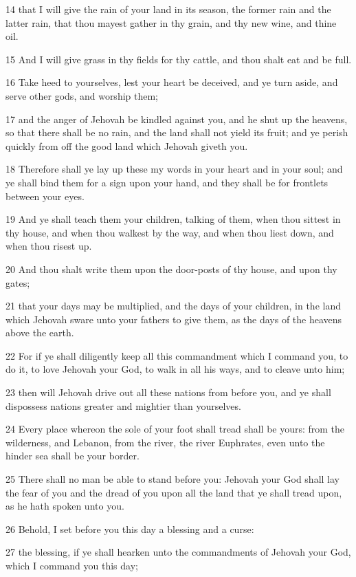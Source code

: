 \par 14 that I will give the rain of your land in its season, the former rain and the latter rain, that thou mayest gather in thy grain, and thy new wine, and thine oil.
\par 15 And I will give grass in thy fields for thy cattle, and thou shalt eat and be full.
\par 16 Take heed to yourselves, lest your heart be deceived, and ye turn aside, and serve other gods, and worship them;
\par 17 and the anger of Jehovah be kindled against you, and he shut up the heavens, so that there shall be no rain, and the land shall not yield its fruit; and ye perish quickly from off the good land which Jehovah giveth you.
\par 18 Therefore shall ye lay up these my words in your heart and in your soul; and ye shall bind them for a sign upon your hand, and they shall be for frontlets between your eyes.
\par 19 And ye shall teach them your children, talking of them, when thou sittest in thy house, and when thou walkest by the way, and when thou liest down, and when thou risest up.
\par 20 And thou shalt write them upon the door-posts of thy house, and upon thy gates;
\par 21 that your days may be multiplied, and the days of your children, in the land which Jehovah sware unto your fathers to give them, as the days of the heavens above the earth.
\par 22 For if ye shall diligently keep all this commandment which I command you, to do it, to love Jehovah your God, to walk in all his ways, and to cleave unto him;
\par 23 then will Jehovah drive out all these nations from before you, and ye shall dispossess nations greater and mightier than yourselves.
\par 24 Every place whereon the sole of your foot shall tread shall be yours: from the wilderness, and Lebanon, from the river, the river Euphrates, even unto the hinder sea shall be your border.
\par 25 There shall no man be able to stand before you: Jehovah your God shall lay the fear of you and the dread of you upon all the land that ye shall tread upon, as he hath spoken unto you.
\par 26 Behold, I set before you this day a blessing and a curse:
\par 27 the blessing, if ye shall hearken unto the commandments of Jehovah your God, which I command you this day;
